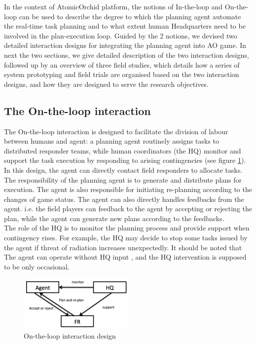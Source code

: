 In the context of AtomicOrchid platform, the notions of In-the-loop and On-the-loop can be used to describe the degree to which the planning agent automate the real-time task planning and to what extent human Headquarters need to be involved in the plan-execution loop. Guided by the 2 notions, we devised two detailed interaction designs for integrating the planning agent into AO game. In next the two sections, we give detailed description of the two interaction designs, followed up by an overview of three field studies, which details how a series of system prototyping  and field trials are organised based on the two interaction designs, and how they are designed to serve the research objectives.\\

\subsection{The On-the-loop interaction}
The On-the-loop interaction is designed to facilitate the division of labour between humans and agent: a planning agent routinely assigns tasks to distributed responder teams, while human coordinators (the HQ) monitor and support the task execution by responding to arising contingencies (see figure \ref{fig:OnTheLoop}). In this design, the agent can directly contact field responders to allocate tasks. The responsibility of the planning agent is to generate and distribute plans for execution. The agent is also responsible for initiating re-planning according to the changes of game status. The agent can also directly handles feedbacks from the agent. i.e. the field players can feedback to the agent by accepting or rejecting the plan, while the agent can generate new plans according to the feedbacks. \\

The role of the HQ is to monitor the planning process and provide support when contingency rises. For example, the HQ may decide to stop some tasks issued by the agent if threat of radiation increases unexpectedly. It should be noted that The agent can operate without HQ input , and the HQ intervention is supposed to be only occasional. \\

\begin{figure}[h]
  \centering
  \includegraphics[width=0.5\textwidth]{img/approach/OnTheLoop}
  \caption{On-the-loop interaction design}
  \label{fig:OnTheLoop}
\end{figure}

